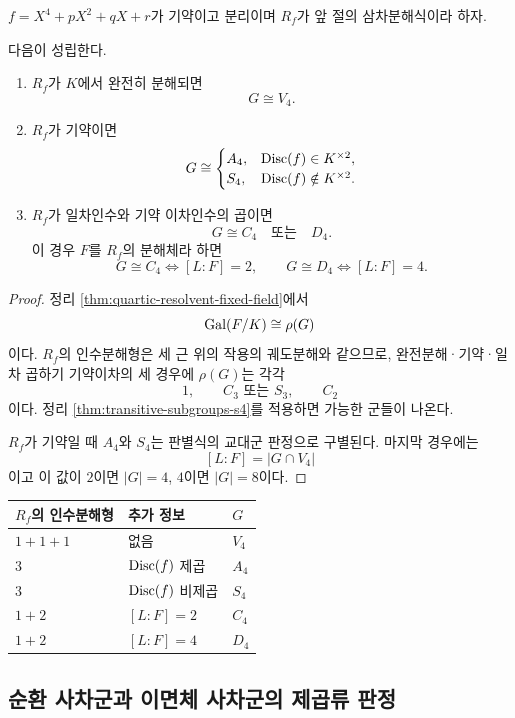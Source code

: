 $f=X^4+pX^2+qX+r$가 기약이고 분리이며 $R_f$가 앞 절의 삼차분해식이라 하자.

\begin{theorem}[기약 사차식의 판정]
\label{thm:quartic-galois-decision}
다음이 성립한다.
\begin{enumerate}[label=(\roman*)]
  \item $R_f$가 $K$에서 완전히 분해되면
  \[
    G\cong V_4.
  \]
  \item $R_f$가 기약이면
  \[
    G\cong
    \begin{cases}
      A_4,&\operatorname{Disc}(f)\in K^{\times2},\\
      S_4,&\operatorname{Disc}(f)\notin K^{\times2}.
    \end{cases}
  \]
  \item $R_f$가 일차인수와 기약 이차인수의 곱이면
  \[
    G\cong C_4\quad\text{또는}\quad D_4.
  \]
  이 경우 $F$를 $R_f$의 분해체라 하면
  \[
    G\cong C_4\iff[L:F]=2,
    \qquad
    G\cong D_4\iff[L:F]=4.
  \]
\end{enumerate}
\end{theorem}

\begin{proof}
정리 \ref{thm:quartic-resolvent-fixed-field}에서
\[
  \operatorname{Gal}(F/K)\cong\rho(G)
\]
이다. $R_f$의 인수분해형은 세 근 위의 작용의 궤도분해와 같으므로, 완전분해·기약·일차 곱하기 기약이차의 세 경우에 $\rho(G)$는 각각
\[
  1,\qquad C_3\text{ 또는 }S_3,\qquad C_2
\]
이다. 정리 \ref{thm:transitive-subgroups-s4}를 적용하면 가능한 군들이 나온다.

$R_f$가 기약일 때 $A_4$와 $S_4$는 판별식의 교대군 판정으로 구별된다. 마지막 경우에는
\[
  [L:F]=|G\cap V_4|
\]
이고 이 값이 $2$이면 $|G|=4$, $4$이면 $|G|=8$이다.
\end{proof}

\begin{center}
\renewcommand{\arraystretch}{1.25}
\begin{tabular}{lll}
\toprule
$R_f$의 인수분해형 & 추가 정보 & $G$ \\
\midrule
$1+1+1$ & 없음 & $V_4$ \\
$3$ & $\operatorname{Disc}(f)$ 제곱 & $A_4$ \\
$3$ & $\operatorname{Disc}(f)$ 비제곱 & $S_4$ \\
$1+2$ & $[L:F]=2$ & $C_4$ \\
$1+2$ & $[L:F]=4$ & $D_4$ \\
\bottomrule
\end{tabular}
\end{center}

\subsection{순환 사차군과 이면체 사차군의 제곱류 판정}

